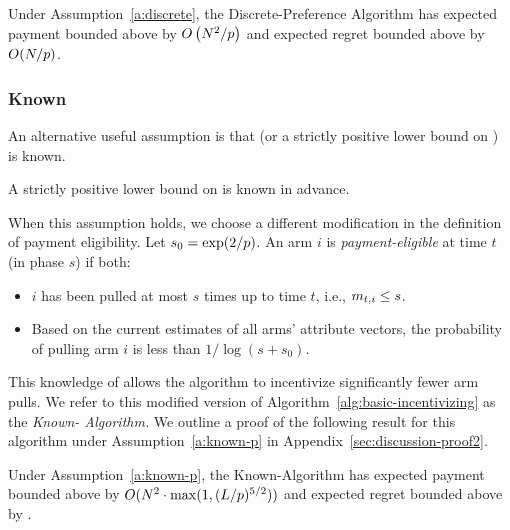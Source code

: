 \begin{theorem}
\label{rst:discrete}
Under Assumption~\ref{a:discrete}, the Discrete-Preference Algorithm
has expected payment bounded above by 
$O \left(N^2/p \right)$
and expected regret bounded above by $O(N / p)$.
\end{theorem}

\subsubsection{Known \MinProb}
An alternative useful assumption is that \MinProb
(or a strictly positive lower bound on \MinProb) is known. 

\begin{assumption}
\label{a:known-p}
A strictly positive lower bound on \MinProb is known in advance.
\end{assumption}

When this assumption holds, we choose a different modification in the
definition of payment eligibility.
Let $s_0 = \exp(2/p)$.
An arm $i$ is \emph{payment-eligible} at time $t$ (in phase $s$)
if both:
\begin{itemize}
\item $i$ has been pulled at most
$s$ times up to time $t$, i.e., $m_{t,i} \leq s$.
\item Based on the current estimates  of all arms' attribute vectors,
the probability of pulling arm $i$ is less than $1/\log(s+s_0)$.
\end{itemize}

This knowledge of \MinProb allows the algorithm to incentivize
significantly fewer arm pulls.
We refer to this modified version of
Algorithm~\ref{alg:basic-incentivizing} as the \emph{Known-\MinProb
Algorithm.}
We outline a proof of the following result for this algorithm under
Assumption~\ref{a:known-p} in Appendix~\ref{sec:discussion-proof2}.

\begin{theorem}
\label{rst:known-p}
Under Assumption~\ref{a:known-p}, the Known-\MinProb Algorithm has
expected payment  bounded above by  
$O(N^2 \cdot \max(1,(L/p)^{5/2}))$ 
and expected regret bounded above by
.
\end{theorem}

